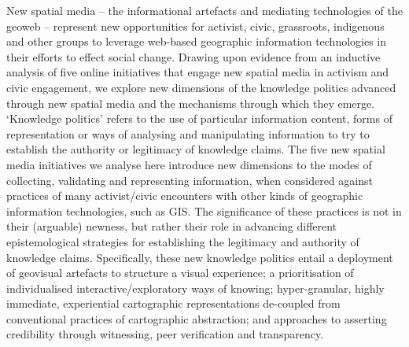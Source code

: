 New spatial media – the informational artefacts and mediating technologies of the geoweb – represent new opportunities for activist, civic, grassroots, indigenous and other groups to leverage web-based geographic information technologies in their efforts to effect social change. Drawing upon evidence from an inductive analysis of five online initiatives that engage new spatial media in activism and civic engagement, we explore new dimensions of the knowledge politics advanced through new spatial media and the mechanisms through which they emerge. ‘Knowledge politics’ refers to the use of particular information content, forms of representation or ways of analysing and manipulating information to try to establish the authority or legitimacy of knowledge claims. The five new spatial media initiatives we analyse here introduce new dimensions to the modes of collecting, validating and representing information, when considered against practices of many activist/civic encounters with other kinds of geographic information technologies, such as GIS. The significance of these practices is not in their (arguable) newness, but rather their role in advancing different epistemological strategies for establishing the legitimacy and authority of knowledge claims. Specifically, these new knowledge politics entail a deployment of geovisual artefacts to structure a visual experience; a prioritisation of individualised interactive/exploratory ways of knowing; hyper-granular, highly immediate, experiential cartographic representations de-coupled from conventional practices of cartographic abstraction; and approaches to asserting credibility through witnessing, peer verification and transparency.